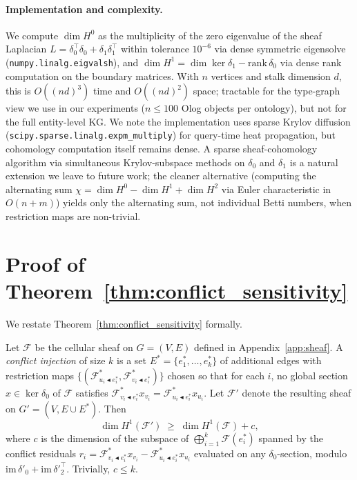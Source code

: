 \paragraph{Implementation and complexity.} We compute $\dim H^0$ as the
multiplicity of the zero eigenvalue of the sheaf Laplacian
$L = \delta_0^\top \delta_0 + \delta_1 \delta_1^\top$ within tolerance
$10^{-6}$ via dense symmetric eigensolve (\texttt{numpy.linalg.eigvalsh}),
and $\dim H^1 = \dim \ker \delta_1 - \mathrm{rank}\, \delta_0$ via dense
rank computation on the boundary matrices. With $n$ vertices and stalk
dimension $d$, this is $O((nd)^3)$ time and $O((nd)^2)$ space; tractable
for the type-graph view we use in our experiments ($n \leq 100$ Olog
objects per ontology), but not for the full entity-level KG. We note the
implementation uses sparse Krylov diffusion
(\texttt{scipy.sparse.linalg.expm\_multiply}) for query-time heat
propagation, but cohomology computation itself remains dense. A sparse
sheaf-cohomology algorithm via simultaneous Krylov-subspace methods on
$\delta_0$ and $\delta_1$ is a natural extension we leave to future work;
the cleaner alternative (computing the alternating sum
$\chi = \dim H^0 - \dim H^1 + \dim H^2$ via Euler characteristic in
$O(n + m)$) yields only the alternating sum, not individual Betti numbers,
when restriction maps are non-trivial.

\section{Proof of Theorem~\ref{thm:conflict_sensitivity}}
\label{app:conflict_proof}

We restate Theorem~\ref{thm:conflict_sensitivity} formally.

\begin{theorem}
\label{thm:conflict_sensitivity_full}
Let $\mathcal{F}$ be the cellular sheaf on $G = (V, E)$ defined in
Appendix~\ref{app:sheaf}. A \emph{conflict injection} of size $k$ is a set
$E^* = \{e^*_1, \ldots, e^*_k\}$ of additional edges with restriction maps
$\{(\mathcal{F}^*_{u_i \blacktriangleleft e^*_i}, \mathcal{F}^*_{v_i
\blacktriangleleft e^*_i})\}$ chosen so that for each $i$, no global section
$x \in \ker \delta_0$ of $\mathcal{F}$ satisfies
$\mathcal{F}^*_{v_i \blacktriangleleft e^*_i} x_{v_i} =
\mathcal{F}^*_{u_i \blacktriangleleft e^*_i} x_{u_i}$. Let $\mathcal{F}'$
denote the resulting sheaf on $G' = (V, E \cup E^*)$. Then
\begin{equation}
\dim H^1(\mathcal{F}') \;\geq\; \dim H^1(\mathcal{F}) + c,
\label{eq:conflict_sensitivity}
\end{equation}
where $c$ is the dimension of the subspace of $\bigoplus_{i=1}^{k}
\mathcal{F}(e^*_i)$ spanned by the conflict residuals
$r_i = \mathcal{F}^*_{v_i \blacktriangleleft e^*_i} x_{v_i} -
\mathcal{F}^*_{u_i \blacktriangleleft e^*_i} x_{u_i}$ evaluated on any
$\delta_0$-section, modulo $\mathrm{im}\,\delta'_0 + \mathrm{im}\,\delta'^\top_2$. Trivially, $c \leq k$.
\end{theorem}

